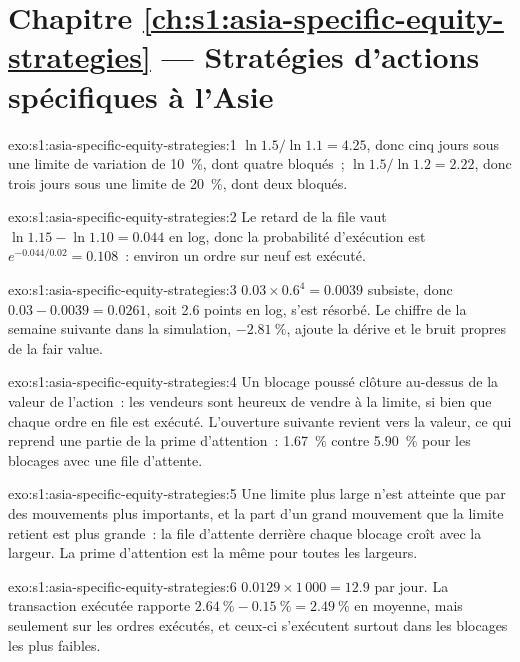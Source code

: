 \section*{Chapitre \ref{ch:s1:asia-specific-equity-strategies} --- Stratégies d'actions spécifiques à l'Asie}

\begin{solution}{exo:s1:asia-specific-equity-strategies:1}
$\ln 1.5/\ln 1.1 = 4.25$, donc cinq jours sous une limite de variation de 10~\%, dont quatre bloqués~; $\ln 1.5/\ln 1.2 = 2.22$, donc trois jours sous une limite de 20~\%, dont deux bloqués.
\end{solution}

\begin{solution}{exo:s1:asia-specific-equity-strategies:2}
Le retard de la file vaut $\ln 1.15 - \ln 1.10 = 0.044$ en log, donc la probabilité d'exécution est $e^{-0.044/0.02} = 0.108$~: environ un ordre sur neuf est exécuté.
\end{solution}

\begin{solution}{exo:s1:asia-specific-equity-strategies:3}
$0.03 \times 0.6^4 = 0.0039$ subsiste, donc $0.03 - 0.0039 = 0.0261$, soit 2.6 points en log, s'est résorbé. Le chiffre de la semaine suivante dans la simulation, $-2.81~\%$,
ajoute la dérive et le bruit propres de la fair value.
\end{solution}

\begin{solution}{exo:s1:asia-specific-equity-strategies:4}
Un blocage poussé clôture au-dessus de la valeur de l'action~: les vendeurs sont heureux de vendre à la limite, si bien que chaque ordre en file est exécuté. L'ouverture suivante revient vers la
valeur, ce qui reprend une partie de la prime d'attention~: 1.67~\% contre 5.90~\% pour les blocages avec une file d'attente.
\end{solution}

\begin{solution}{exo:s1:asia-specific-equity-strategies:5}
Une limite plus large n'est atteinte que par des mouvements plus importants, et la part d'un grand mouvement que la limite retient est plus grande~: la file d'attente derrière chaque blocage croît avec
la largeur. La prime d'attention est la même pour toutes les largeurs.
\end{solution}

\begin{solution}{exo:s1:asia-specific-equity-strategies:6}
$0.0129 \times 1\,000 = 12.9$ par jour. La transaction exécutée rapporte $2.64~\% - 0.15~\% = 2.49~\%$ en moyenne, mais seulement sur les ordres exécutés, et ceux-ci s'exécutent surtout
dans les blocages les plus faibles.
\end{solution}

